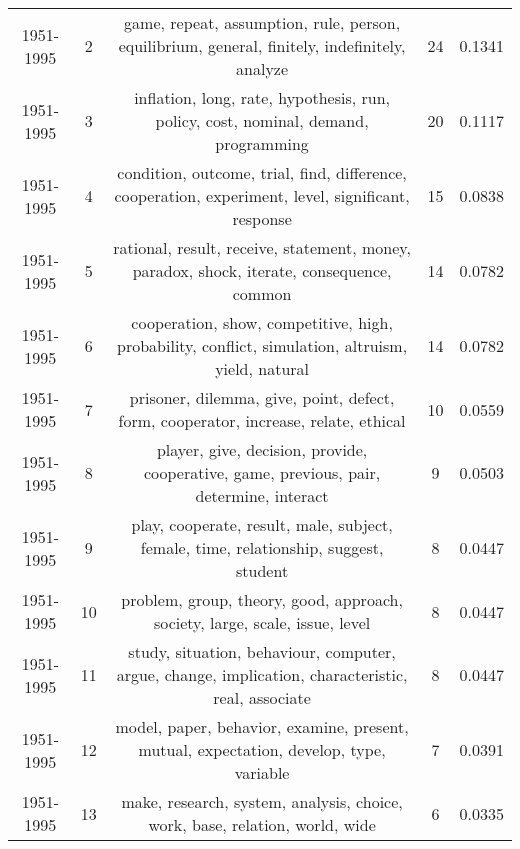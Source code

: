 \begin{tabular}{ccccc}
 1951-1995 &               2 &                 game, repeat, assumption, rule, person, equilibrium, general, finitely, indefinitely, analyze &               24 &                  0.1341 \\
 1951-1995 &               3 &                            inflation, long, rate, hypothesis, run, policy, cost, nominal, demand, programming &               20 &                  0.1117 \\
 1951-1995 &               4 &            condition, outcome, trial, find, difference, cooperation, experiment, level, significant, response &               15 &                  0.0838 \\
 1951-1995 &               5 &                     rational, result, receive, statement, money, paradox, shock, iterate, consequence, common &               14 &                  0.0782 \\
 1951-1995 &               6 &             cooperation, show, competitive, high, probability, conflict, simulation, altruism, yield, natural &               14 &                  0.0782 \\
 1951-1995 &               7 &                           prisoner, dilemma, give, point, defect, form, cooperator, increase, relate, ethical &               10 &                  0.0559 \\
 1951-1995 &               8 &                       player, give, decision, provide, cooperative, game, previous, pair, determine, interact &                9 &                  0.0503 \\
 1951-1995 &               9 &                          play, cooperate, result, male, subject, female, time, relationship, suggest, student &                8 &                  0.0447 \\
 1951-1995 &              10 &                                   problem, group, theory, good, approach, society, large, scale, issue, level &                8 &                  0.0447 \\
 1951-1995 &              11 &            study, situation, behaviour, computer, argue, change, implication, characteristic, real, associate &                8 &                  0.0447 \\
 1951-1995 &              12 &                        model, paper, behavior, examine, present, mutual, expectation, develop, type, variable &                7 &                  0.0391 \\
 1951-1995 &              13 &                                   make, research, system, analysis, choice, work, base, relation, world, wide &                6 &                  0.0335 \\

\end{tabular}
